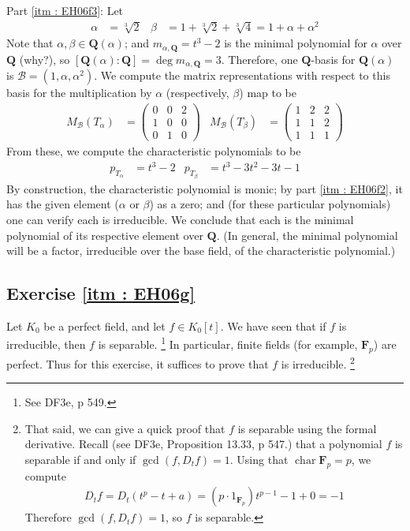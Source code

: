 \documentclass[oneside, english, 11pt]{article}
\newcommand{\fontField}[1]{\mathbf{#1}}
\DeclareMathOperator{\characteristic}{char}
\newcommand{\F}{\fontField{F}}
\newcommand{\Q}{\rationals}
\newcommand{\rationals}{\fontField{Q}}
\begin{document}
Part \ref{itm : EH06f3}: Let
\begin{align*}
\alpha
&=
\sqrt[3]{2}
&
\beta
&=
1 + \sqrt[3]{2} + \sqrt[3]{4}
=
1 + \alpha + \alpha^{2}
\end{align*}
Note that $\alpha, \beta \in \Q(\alpha)$; and $m_{\alpha, \Q} = t^{3} - 2$ is the minimal polynomial for $\alpha$ over $\Q$ (why?), so $[\Q(\alpha) : \Q] = \deg m_{\alpha, \Q} = 3$. Therefore, one $\Q$-basis for $\Q(\alpha)$ is $\mathcal{B} = (1, \alpha, \alpha^{2})$. We compute the matrix representations with respect to this basis for the multiplication by $\alpha$ (respectively, $\beta$) map to be
\begin{align*}
M_{\mathcal{B}}(T_{\alpha})
&=
\begin{pmatrix}
0	&	0	&	2	\\
1	&	0	&	0	\\
0	&	1	&	0
\end{pmatrix}
&
M_{\mathcal{B}}(T_{\beta})
&=
\begin{pmatrix}
1	&	2	&	2	\\
1	&	1	&	2	\\
1	&	1	&	1
\end{pmatrix}
\end{align*}
From these, we compute the characteristic polynomials to be
\begin{align*}
p_{T_{\alpha}}
&=
t^{3} - 2
&
p_{T_{\beta}}
&=
t^{3} - 3 t^{2} - 3 t - 1
\end{align*}
By construction, the characteristic polynomial is monic; by part \ref{itm : EH06f2}, it has the given element ($\alpha$ or $\beta$) as a zero; and (for these particular polynomials) one can verify each is irreducible. We conclude that each is the minimal polynomial of its respective element over $\Q$. (In general, the minimal polynomial will be a factor, irreducible over the base field, of the characteristic polynomial.)



\subsection*{Exercise \ref{itm : EH06g}}

Let $K_{0}$ be a perfect field, and let $f \in K_{0}[t]$. We have seen that if $f$ is irreducible, then $f$ is separable.%
\footnote{See DF3e, p 549.} %
In particular, finite fields (for example, $\F_{p}$) are perfect. Thus for this exercise, it suffices to prove that $f$ is irreducible.%
\footnote{That said, we can give a quick proof that $f$ is separable using the formal derivative. Recall (see DF3e, Proposition 13.33, p 547.) that a polynomial $f$ is separable if and only if $\gcd(f, D_{t} f) = 1$. Using that $\characteristic \F_{p} = p$, we compute
\begin{align*}
D_{t} f
=
D_{t} (t^{p} - t + a)
=
(p \cdot 1_{\F_{p}}) t^{p - 1} - 1 + 0
=
-1
\end{align*}
Therefore $\gcd(f, D_{t} f) = 1$, so $f$ is separable.}%
\end{document}
